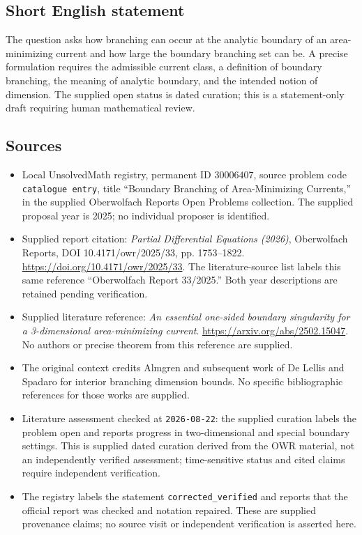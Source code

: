 \documentclass[11pt]{article}
\begin{document}
\subsection{Short English statement}
The question asks how branching can occur at the analytic boundary of an area-minimizing current and how large the boundary branching set can be. A precise formulation requires the admissible current class, a definition of boundary branching, the meaning of analytic boundary, and the intended notion of dimension. The supplied open status is dated curation; this is a statement-only draft requiring human mathematical review.
\subsection{Sources}
\begin{itemize}
\item Local UnsolvedMath registry, permanent ID \(30006407\), source problem code \texttt{catalogue entry}, title ``Boundary Branching of Area-Minimizing Currents,'' in the supplied Oberwolfach Reports Open Problems collection. The supplied proposal year is 2025; no individual proposer is identified.
\item Supplied report citation: \emph{Partial Differential Equations (2026)}, Oberwolfach Reports, DOI 10.4171/owr/2025/33, pp. 1753--1822. \url{https://doi.org/10.4171/owr/2025/33}. The literature-source list labels this same reference ``Oberwolfach Report 33/2025.'' Both year descriptions are retained pending verification.
\item Supplied literature reference: \emph{An essential one-sided boundary singularity for a 3-dimensional area-minimizing current}. \url{https://arxiv.org/abs/2502.15047}. No authors or precise theorem from this reference are supplied.
\item The original context credits Almgren and subsequent work of De Lellis and Spadaro for interior branching dimension bounds. No specific bibliographic references for those works are supplied.
\item Literature assessment checked at \texttt{2026-08-22}: the supplied curation labels the problem open and reports progress in two-dimensional and special boundary settings. This is supplied dated curation derived from the OWR material, not an independently verified assessment; time-sensitive status and cited claims require independent verification.
\item The registry labels the statement \texttt{corrected\_verified} and reports that the official report was checked and notation repaired. These are supplied provenance claims; no source visit or independent verification is asserted here.
\end{itemize}
\end{document}
